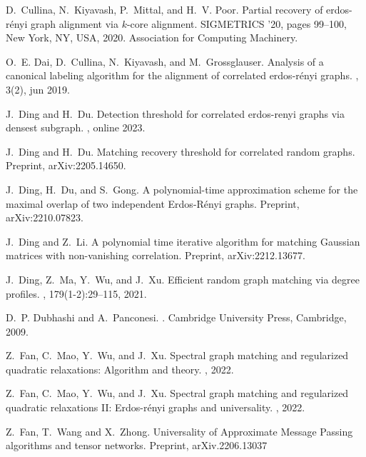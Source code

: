 \documentclass[11pt]{article}
\numberwithin{equation}{section}
\begin{document}
\begin{thebibliography}{10}
D.~Cullina, N.~Kiyavash, P.~Mittal, and H.~V. Poor.
\newblock Partial recovery of erdos-r\'enyi graph alignment via $k$-core alignment.
\newblock SIGMETRICS '20, pages 99--100, New York, NY, USA, 2020. Association for Computing Machinery.

O.~E. Dai, D.~Cullina, N.~Kiyavash, and M.~Grossglauser.
\newblock Analysis of a canonical labeling algorithm for the alignment of correlated erdos-r\'{e}nyi graphs.
, 3(2), jun 2019.

J.~Ding and H.~Du.
\newblock Detection threshold for correlated erdos-renyi graphs via densest subgraph.
, online 2023.

J.~Ding and H.~Du.
\newblock Matching recovery threshold for correlated random graphs.
\newblock Preprint, arXiv:2205.14650.

J.~Ding, H.~Du, and S.~Gong.
\newblock A polynomial-time approximation scheme for the maximal overlap of two independent {E}rdos-{R}\'{e}nyi graphs.
\newblock Preprint, arXiv:2210.07823.

J.~Ding and Z.~Li.
\newblock A polynomial time iterative algorithm for matching Gaussian matrices with non-vanishing correlation.
\newblock Preprint, arXiv:2212.13677.

J.~Ding, Z.~Ma, Y.~Wu, and J.~Xu.
\newblock Efficient random graph matching via degree profiles.
, 179(1-2):29--115, 2021.

D.~P. Dubhashi and A.~Panconesi.
.
\newblock Cambridge University Press, Cambridge, 2009.

Z.~Fan, C.~Mao, Y.~Wu, and J.~Xu.
\newblock Spectral graph matching and regularized quadratic relaxations: Algorithm and theory.
, 2022.

Z.~Fan, C.~Mao, Y.~Wu, and J.~Xu.
\newblock Spectral graph matching and regularized quadratic relaxations {II}: Erdos-r\'enyi graphs and universality.
, 2022.
  
Z.~Fan, T.~Wang and X.~Zhong.
\newblock Universality of Approximate Message Passing algorithms and tensor networks.
\newblock Preprint, arXiv.2206.13037


\end{thebibliography}
\end{document}
